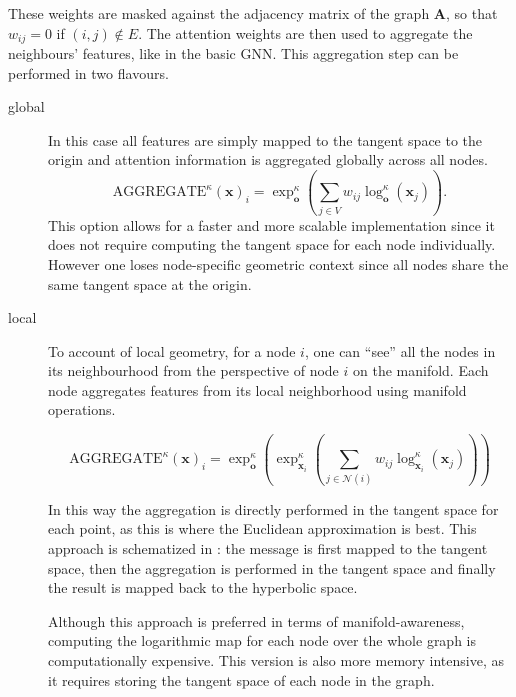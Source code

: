 These weights are masked against the adjacency matrix of the graph $\mathbf{A}$, so that $w_{ij}=0$ if $(i,j)\notin E$. The attention weights are then used to aggregate the neighbours' features, like in the basic GNN. This aggregation step can be performed in two flavours.
\begin{description}
    \item[global] 
    In this case all features are simply mapped to the tangent space to the origin and attention information is aggregated globally across all nodes. 
    \begin{equation*}
        \text{AGGREGATE}^\kappa(\mathbf{x})_i = \exp_{\mathbf{o}}^\kappa\left(\sum_{j\in V}w_{ij}\log_{\mathbf{o}}^\kappa\left(\mathbf{x}_j\right)\right).
    \end{equation*}    
    This option allows for a faster and more scalable implementation since it does not require computing the tangent space for each node individually. However one loses node-specific geometric context since all nodes share the same tangent space at the origin.

    \item[local]
    To account of local geometry, for a node $i$, one can ``see'' all the nodes in its neighbourhood from the perspective of node $i$ on the manifold.
    Each node aggregates features from its local neighborhood using manifold operations.

    \begin{equation*}
        \text{AGGREGATE}^\kappa(\mathbf{x})_i = \exp_{\mathbf{o}}^\kappa\left(\exp_{\mathbf{x}_i}^\kappa\left(\sum_{j\in\mathcal{N}(i)}w_{ij}\log_{\mathbf{x}_i}^\kappa\left(\mathbf{x}_j\right)\right)\right)
    \end{equation*}

    In this way the aggregation is directly performed in the tangent space for each point, as this is where the Euclidean approximation is best. This approach is schematized in : the message is first mapped to the tangent space, then the aggregation is performed in the tangent space and finally the result is mapped back to the hyperbolic space.

    

    Although this approach is preferred in terms of manifold-awareness, computing the logarithmic map for each node over the whole graph is computationally expensive. This version is also more memory intensive, as it requires storing the tangent space of each node in the graph.


\end{description}

